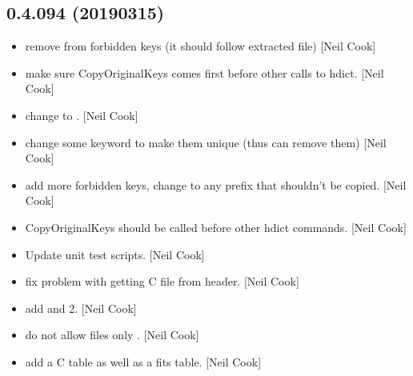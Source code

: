 \documentclass[a4paper,10pt,english]{report}
\begin{document}
\subsection{0.4.094 (2019\sphinxhyphen{}03\sphinxhyphen{}15)}
\label{\detokenize{misc/changelog:id185}}\begin{itemize}
\item {} 
 \sphinxhyphen{} remove  from forbidden keys (it should follow
extracted file) {[}Neil Cook{]}

\item {} 
 \sphinxhyphen{} make sure CopyOriginalKeys comes first before other
calls to hdict. {[}Neil Cook{]}

\item {} 
 \sphinxhyphen{} change  to .
{[}Neil Cook{]}

\item {} 
 \sphinxhyphen{} change some keyword to make them unique (thus can
remove them) {[}Neil Cook{]}

\item {} 
 \sphinxhyphen{} add more forbidden keys, change  to any prefix
that shouldn’t be copied. {[}Neil Cook{]}

\item {} 
 \sphinxhyphen{} CopyOriginalKeys should be called before other
hdict commands. {[}Neil Cook{]}

\item {} 
Update unit test scripts. {[}Neil Cook{]}

\item {} 
 \sphinxhyphen{} fix problem with getting C file from header. {[}Neil Cook{]}

\item {} 
 \sphinxhyphen{} add  and 2. {[}Neil Cook{]}

\item {} 
 \sphinxhyphen{} do not allow  files \sphinxhyphen{} only . {[}Neil
Cook{]}

\item {} 
 \sphinxhyphen{} add a C table as well as a fits table.
{[}Neil Cook{]}


\end{itemize}
\end{document}
